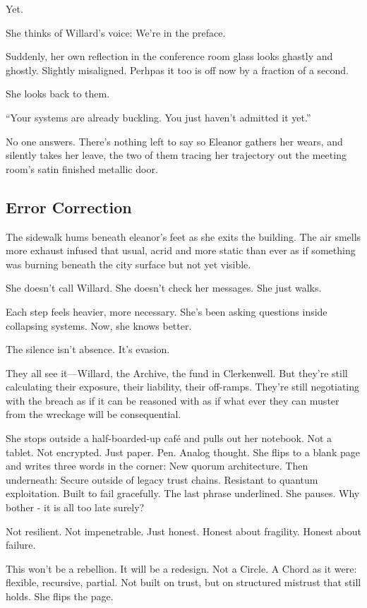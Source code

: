 Yet.

She thinks of Willard’s voice: We’re in the preface.

Suddenly, her own reflection in the conference room glass looks ghastly and ghostly. Slightly misaligned. Perhpas it too is off now by a fraction of a second.

She looks back to them.

“Your systems are already buckling. You just haven’t admitted it yet.”

No one answers.
There’s nothing left to say so Eleanor gathers her wears, and silently takes her leave, the two of them tracing her trajectory out the meeting room's satin finished metallic door.
\subsection*{Error Correction}
The sidewalk hums beneath eleanor's feet as she exits the building. The air smells more exhaust infused that usual, acrid and more static than ever as if something was burning beneath the city surface but not yet visible.

She doesn’t call Willard.
She doesn’t check her messages.
She just walks.

Each step feels heavier, more necessary.
She’s been asking questions inside collapsing systems.
Now, she knows better.

The silence isn’t absence. It’s evasion.

They all see it—Willard, the Archive, the fund in Clerkenwell. But they’re still calculating their exposure, their liability, their off-ramps. They’re still negotiating with the breach as if it can be reasoned with as if what ever they can muster from the wreckage will be consequential.

She stops outside a half-boarded-up café and pulls out her notebook. Not a tablet. Not encrypted. Just paper. Pen. Analog thought. She flips to a blank page and writes three words in the corner: New quorum architecture. Then underneath:
\smallskip
Secure outside of legacy trust chains.
Resistant to quantum exploitation.
Built to fail gracefully.
\smallskip
The last phrase underlined. She pauses. Why bother - it is all too late surely?

Not resilient. Not impenetrable. Just honest.
Honest about fragility. Honest about failure.

This won’t be a rebellion. It will be a redesign. Not a Circle. A Chord as it were: flexible, recursive, partial. Not built on trust, but on structured mistrust that still holds. She flips the page.

